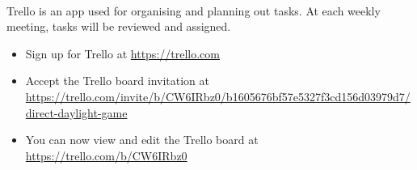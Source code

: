 \documentclass[11pt]{article}
\begin{document}
\paragraph{}
Trello is an app used for organising and planning out tasks. At each weekly meeting, tasks will be reviewed and assigned.
\begin{itemize}
\item Sign up for Trello at \url{https://trello.com}
\item Accept the Trello board invitation at \\ \url{https://trello.com/invite/b/CW6IRbz0/b1605676bf57e5327f3cd156d03979d7/direct-daylight-game}
\item You can now view and edit the Trello board at \url{https://trello.com/b/CW6IRbz0}
\end{itemize}
\end{document}
